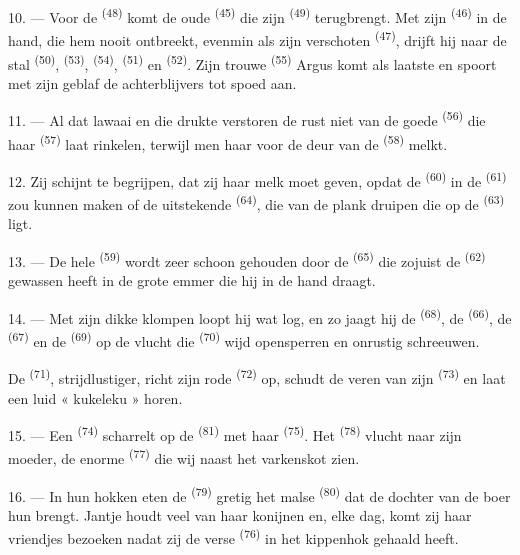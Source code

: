 10. --- Voor de  \textsuperscript{(48)} komt de oude
 \textsuperscript{(45)} die zijn 
\textsuperscript{(49)} terugbrengt. Met zijn  \textsuperscript{(46)} in de
hand, die hem nooit ontbreekt, evenmin als zijn verschoten 
\textsuperscript{(47)}, drijft hij naar de stal
 \textsuperscript{(50)}, 
\textsuperscript{(53)},  \textsuperscript{(54)},
 \textsuperscript{(51)} en 
\textsuperscript{(52)}. Zijn trouwe  \textsuperscript{(55)} Argus komt als
laatste en spoort met zijn geblaf de achterblijvers tot spoed aan.

11. --- Al dat lawaai en die drukte verstoren de rust niet van de goede
 \textsuperscript{(56)} die haar 
\textsuperscript{(57)} laat rinkelen, terwijl men haar voor de deur van de
 \textsuperscript{(58)} melkt.

12. Zij schijnt te begrijpen, dat zij haar melk moet geven, opdat de
 \textsuperscript{(60)}  in de 
\textsuperscript{(61)} zou kunnen maken of de uitstekende 
\textsuperscript{(64)}, die van de plank druipen die op de 
\textsuperscript{(63)} ligt.

13. --- De hele  \textsuperscript{(59)} wordt zeer schoon gehouden door de
 \textsuperscript{(65)} die zojuist de
 \textsuperscript{(62)} gewassen heeft in de grote emmer die
hij in de hand draagt.

\VUsaut{3.0mm}
\VUsaut{3.0mm}

14. --- Met zijn dikke klompen loopt hij wat log, en zo jaagt hij de
 \textsuperscript{(68)}, de 
\textsuperscript{(66)}, de  \textsuperscript{(67)} en de
 \textsuperscript{(69)} op de vlucht die 
\textsuperscript{(70)} wijd opensperren en onrustig schreeuwen.

De  \textsuperscript{(71)}, strijdlustiger, richt zijn rode
 \textsuperscript{(72)} op, schudt de veren van zijn 
\textsuperscript{(73)} en laat een luid « kukeleku » horen.

15. --- Een  \textsuperscript{(74)} scharrelt op de
 \textsuperscript{(81)} met haar 
\textsuperscript{(75)}. Het  \textsuperscript{(78)} vlucht naar zijn moeder,
de enorme  \textsuperscript{(77)} die wij naast het varkenskot zien.

16. --- In hun hokken eten de  \textsuperscript{(79)} gretig het malse
 \textsuperscript{(80)} dat de dochter van de boer hun brengt. Jantje houdt veel
van haar konijnen en, elke dag, komt zij haar vriendjes bezoeken nadat zij de verse
 \textsuperscript{(76)} in het kippenhok gehaald heeft.
\VUsaut{6.0mm}
\VUfilet{22mm}
